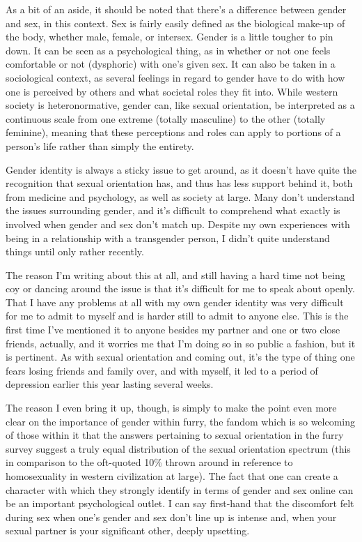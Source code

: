 As a bit of an aside, it should be noted that there's a difference between gender and sex, in this context.  Sex is fairly easily defined as the biological make-up of the body, whether male, female, or intersex.  Gender is a little tougher to pin down.  It can be seen as a psychological thing, as in whether or not one feels comfortable or not (dysphoric) with one's given sex.  It can also be taken in a sociological context, as several feelings in regard to gender have to do with how one is perceived by others and what societal roles they fit into.  While western society is heteronormative, gender can, like sexual orientation, be interpreted as a continuous scale from one extreme (totally masculine) to the other (totally feminine), meaning that these perceptions and roles can apply to portions of a person's life rather than simply the entirety.

Gender identity is always a sticky issue to get around, as it doesn't have quite the recognition that sexual orientation has, and thus has less support behind it, both from medicine and psychology, as well as society at large.  Many don't understand the issues surrounding gender, and it's difficult to comprehend what exactly is involved when gender and sex don't match up.  Despite my own experiences with being in a relationship with a transgender person, I didn't quite understand things until only rather recently.

The reason I'm writing about this at all, and still having a hard time not being coy or dancing around the issue is that it's difficult for me to speak about openly.  That I have any problems at all with my own gender identity was very difficult for me to admit to myself and is harder still to admit to anyone else.  This is the first time I've mentioned it to anyone besides my partner and one or two close friends, actually, and it worries me that I'm doing so in so public a fashion, but it is pertinent.  As with sexual orientation and coming out, it's the type of thing one fears losing friends and family over, and with myself, it led to a period of depression earlier this year lasting several weeks.

The reason I even bring it up, though, is simply to make the point even more clear on the importance of gender within furry, the fandom which is so welcoming of those within it that the answers pertaining to sexual orientation in the furry survey suggest a truly equal distribution of the sexual orientation spectrum (this in comparison to the oft-quoted 10\% thrown around in reference to homosexuality in western civilization at large).  The fact that one can create a character with which they strongly identify in terms of gender and sex online can be an important psychological outlet.  I can say first-hand that the discomfort felt during sex when one's gender and sex don't line up is intense and, when your sexual partner is your significant other, deeply upsetting.

